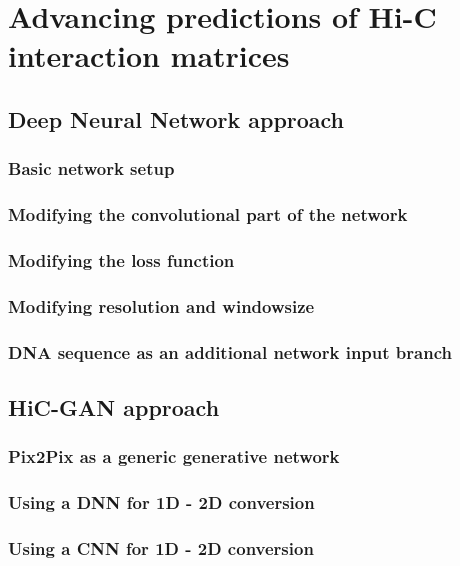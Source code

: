 \section{Advancing predictions of Hi-C interaction matrices}
\subsection{Deep Neural Network approach}
\subsubsection{Basic network setup}
\subsubsection{Modifying the convolutional part of the network}
\subsubsection{Modifying the loss function}
\subsubsection{Modifying resolution and windowsize}
\subsubsection{DNA sequence as an additional network input branch}
\subsection{HiC-GAN approach}
\subsubsection{Pix2Pix as a generic generative network}
\subsubsection{Using a DNN for 1D - 2D conversion}
\subsubsection{Using a CNN for 1D - 2D conversion}

